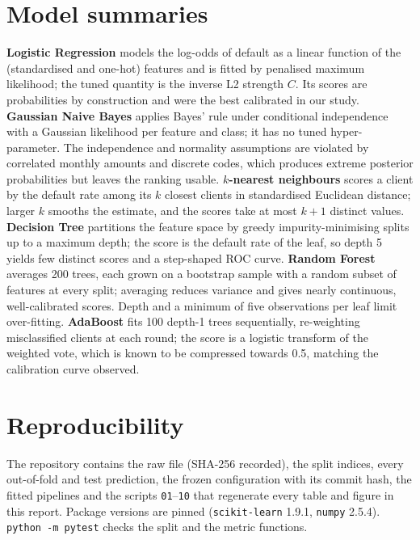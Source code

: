 \documentclass{article}
\begin{document}
\section{Model summaries}
\label{app:models}
\textbf{Logistic Regression} models the log-odds of default as a linear function of the (standardised and one-hot) features and is fitted by penalised maximum likelihood; the tuned quantity is the inverse L2 strength $C$. Its scores are probabilities by construction and were the best calibrated in our study. \textbf{Gaussian Naive Bayes} applies Bayes' rule under conditional independence with a Gaussian likelihood per feature and class; it has no tuned hyper-parameter. The independence and normality assumptions are violated by correlated monthly amounts and discrete codes, which produces extreme posterior probabilities but leaves the ranking usable. \textbf{$k$-nearest neighbours} scores a client by the default rate among its $k$ closest clients in standardised Euclidean distance; larger $k$ smooths the estimate, and the scores take at most $k+1$ distinct values. \textbf{Decision Tree} partitions the feature space by greedy impurity-minimising splits up to a maximum depth; the score is the default rate of the leaf, so depth 5 yields few distinct scores and a step-shaped ROC curve. \textbf{Random Forest} averages 200 trees, each grown on a bootstrap sample with a random subset of features at every split; averaging reduces variance and gives nearly continuous, well-calibrated scores. Depth and a minimum of five observations per leaf limit over-fitting. \textbf{AdaBoost} fits 100 depth-1 trees sequentially, re-weighting misclassified clients at each round; the score is a logistic transform of the weighted vote, which is known to be compressed towards 0.5, matching the calibration curve observed.

\section{Reproducibility}
The repository contains the raw file (SHA-256 recorded), the split indices, every out-of-fold and test prediction, the frozen configuration with its commit hash, the fitted pipelines and the scripts \texttt{01}--\texttt{10} that regenerate every table and figure in this report. Package versions are pinned (\texttt{scikit-learn} 1.9.1, \texttt{numpy} 2.5.4). \texttt{python -m pytest} checks the split and the metric functions.
\end{document}
